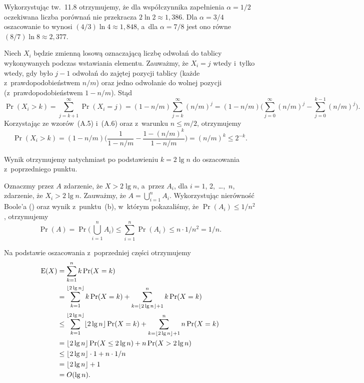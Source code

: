 \exercise %
\exercise %
Wykorzystując tw.~11.8 otrzymujemy, że dla współczynnika zapełnienia $\alpha=1/2$ oczekiwana liczba porównań nie przekracza $2\ln2\approx1{,}386$. Dla $\alpha=3/4$ oszacowanie to wynosi $(4/3)\ln4\approx1{,}848$, a~dla $\alpha=7/8$ jest ono równe $(8/7)\ln8\approx2{,}377$.

\exercise %


\exercise %

\problems


\subproblem %
Niech $X_i$ będzie zmienną losową oznaczającą liczbę odwołań do tablicy wykonywanych podczas wstawiania  elementu. Zauważmy, że $X_i=j$ wtedy i~tylko wtedy, gdy było $j-1$ odwołań do zajętej pozycji tablicy (każde z~prawdopodobieństwem $n/m$) oraz jedno odwołanie do wolnej pozycji (z~prawdopodobieństwem $1-n/m$). Stąd
\[
	\Pr(X_i>k) = \sum_{j=k+1}^\infty\Pr(X_i=j) = (1-n/m)\sum_{j=k}^\infty(n/m)^j = (1-n/m)\biggl(\sum_{j=0}^\infty(n/m)^j-\sum_{j=0}^{k-1}(n/m)^j\biggr).
\]
Korzystając ze wzorów~(A.5) i~(A.6) oraz z~warunku $n\le m/2$, otrzymujemy
\[
	\Pr(X_i>k) = (1-n/m)\biggl(\frac{1}{1-n/m}-\frac{1-(n/m)^k}{1-n/m}\biggr) = (n/m)^k \le 2^{-k}.
\]

\subproblem %
Wynik otrzymujemy natychmiast po podstawieniu $k=2\lg n$ do oszacowania z~poprzedniego punktu.

\subproblem %
Oznaczmy przez $A$ zdarzenie, że $X>2\lg n$, a~przez $A_i$, dla $i=1$, 2,~\dots,~$n$, zdarzenie, że $X_i>2\lg n$. Zauważmy, że $A=\bigcup_{i=1}^nA_i$. Wykorzystując nierówność Boole'a () oraz wynik z~punktu~(b), w~którym pokazaliśmy, że $\Pr(A_i)\le1/n^2$, otrzymujemy
\[
	\Pr(A) = \Pr\biggl(\bigcup_{i=1}^nA_i\biggr) \le \sum_{i=1}^n\Pr(A_i) \le n\cdot1/n^2 = 1/n.
\]

\subproblem %
Na podstawie oszacowania z~poprzedniej części otrzymujemy
\begin{align*}
	\operatorname{E}(X) &= \sum_{k=1}^nk\Pr(X=k) \\
	&= \sum_{k=1}^{\lfloor2\lg n\rfloor}k\Pr(X=k)+\sum_{k=\lfloor2\lg n\rfloor+1}^nk\Pr(X=k) \\
	&\le \sum_{k=1}^{\lfloor2\lg n\rfloor}\lfloor2\lg n\rfloor\Pr(X=k)+\sum_{k=\lfloor2\lg n\rfloor+1}^nn\Pr(X=k) \\
	&= \lfloor2\lg n\rfloor\Pr(X\le2\lg n)+n\Pr(X>2\lg n) \\
	&\le \lfloor2\lg n\rfloor\cdot1+n\cdot1/n \\
	&= \lfloor2\lg n\rfloor+1 \\
	&= O(\lg n).
\end{align*}

